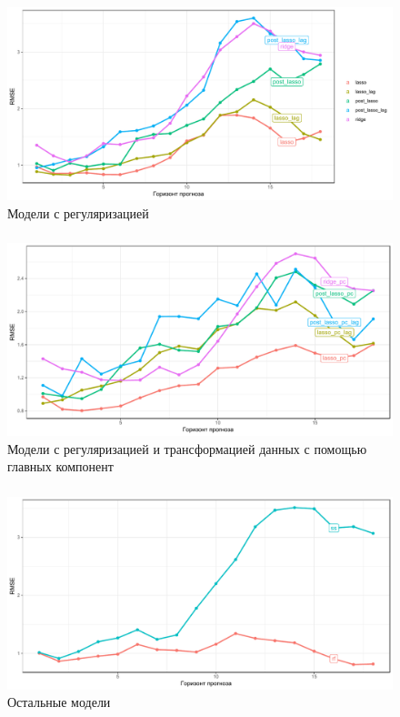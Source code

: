 \documentclass[c, dvipsnames]{beamer}  %
\begin{document}
\begin{frame}
\frametitle{\insertsection} 
\framesubtitle{\insertsubsection}
\begin{figure}
\caption{Модели с регуляризацией}
\includegraphics[width=\linewidth]{reg_score.pdf}
\end{figure}
\end{frame}


\begin{frame}
\frametitle{\insertsection} 
\framesubtitle{\insertsubsection}
\begin{figure}
\caption{Модели с регуляризацией и трансформацией данных с помощью главных компонент}
\includegraphics[width=\linewidth]{regpc_score.pdf}
\end{figure}
\end{frame}


\begin{frame}
\frametitle{\insertsection} 
\framesubtitle{\insertsubsection}
\begin{figure}
\caption{Остальные модели}
\includegraphics[width=\linewidth]{rfss_score.pdf}
\end{figure}
\end{frame}
\end{document}
